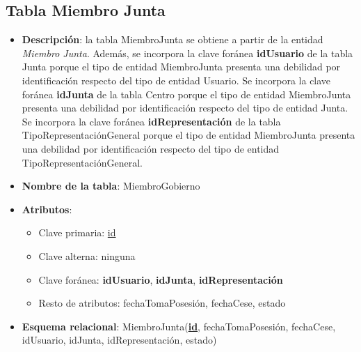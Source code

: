 \subsection{Tabla Miembro Junta}
    \begin{itemize}
        \item \textbf{Descripción}: la tabla MiembroJunta se obtiene a partir de la entidad \textit{Miembro Junta}. Además, se incorpora la clave foránea \textbf{idUsuario} de la tabla Junta porque el tipo de entidad MiembroJunta presenta una debilidad por identificación respecto del tipo de entidad Usuario. Se incorpora la clave foránea \textbf{idJunta} de la tabla Centro porque el tipo de entidad MiembroJunta presenta una debilidad por identificación respecto del tipo de entidad Junta. Se incorpora la clave foránea \textbf{idRepresentación} de la tabla TipoRepresentaciónGeneral porque el tipo de entidad MiembroJunta presenta una debilidad por identificación respecto del tipo de entidad TipoRepresentaciónGeneral.
        \item \textbf{Nombre de la tabla}: MiembroGobierno
        \item \textbf{Atributos}:
            \begin{itemize}
                \item Clave primaria: \underline{id}
                \item Clave alterna: ninguna
                \item Clave foránea: \textbf{idUsuario}, \textbf{idJunta}, \textbf{idRepresentación}
                \item Resto de atributos: fechaTomaPosesión, fechaCese, estado
            \end{itemize}
        \item \textbf{Esquema relacional}: 
            MiembroJunta(\textbf{\underline{id}}, fechaTomaPosesión, fechaCese, idUsuario, idJunta, idRepresentación, estado)
    \end{itemize}

